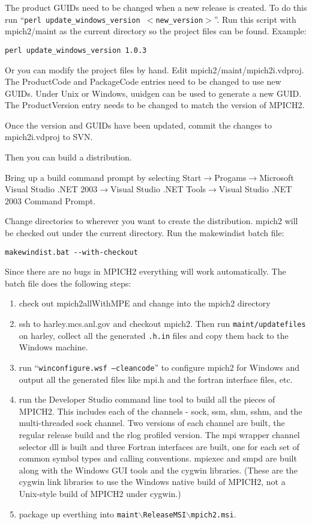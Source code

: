 \documentclass[dvipdfm,11pt]{article}
\begin{document}
The product GUIDs need to be changed when a new release is created.  To do this run 
``\texttt{perl update\_windows\_version $<$new\_version$>$}''.  Run this script with mpich2/maint 
as the current directory so the project files can be found.  Example:
\begin{verbatim}
perl update_windows_version 1.0.3
\end{verbatim}

Or you can modify the project files by hand.  Edit mpich2/maint/mpich2i.vdproj.  The ProductCode
and PackageCode entries need to be changed to use new GUIDs.  Under Unix or Windows, uuidgen can 
be used to generate a new GUID.  The ProductVersion entry needs to be changed to match the 
version of MPICH2.

Once the version and GUIDs have been updated, commit the changes to mpich2i.vdproj to SVN.

Then you can build a distribution.

Bring up a build command prompt by selecting Start$\to$Progams$\to$Microsoft Visual Studio 
.NET 2003$\to$Visual Studio .NET Tools$\to$Visual Studio .NET 2003 Command Prompt.

Change directories to wherever you want to create the distribution.  mpich2 will be checked 
out under the current directory.  Run the makewindist batch file:

\begin{verbatim}
makewindist.bat --with-checkout
\end{verbatim}

Since there are no bugs in MPICH2 everything will work automatically.  The batch file does the
following steps:
\begin{enumerate}
\item check out mpich2allWithMPE and change into the mpich2 directory
\item ssh to harley.mcs.anl.gov and checkout mpich2.  Then run \texttt{maint/updatefiles} on
harley, collect all the generated \texttt{.h.in} files and copy them back to the Windows
machine.
\item run ``\texttt{winconfigure.wsf --cleancode}'' to configure mpich2 for Windows and output
all the generated files like mpi.h and the fortran interface files, etc.
\item run the Developer Studio command line tool to build all the pieces of MPICH2.  This
includes each of the channels - sock, ssm, shm, sshm, and the multi-threaded sock
channel.  Two versions of each channel are built, the regular release build and the rlog
profiled version.  The mpi wrapper channel selector dll is built and three Fortran interfaces
are built, one for each set of common symbol types and calling conventions.  mpiexec and
smpd are built along with the Windows GUI tools and the cygwin libraries.  (These are the cygwin
link libraries to use the Windows native build of MPICH2, not a Unix-style build of MPICH2
under cygwin.)
\item package up everthing into \texttt{maint$\backslash$ReleaseMSI$\backslash$mpich2.msi}.
\end{enumerate}
\end{document}
